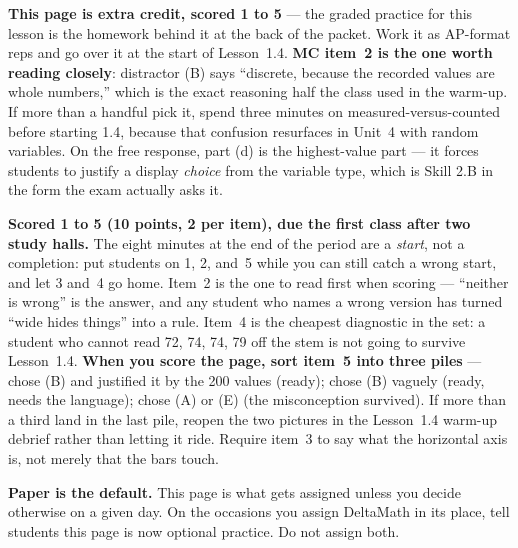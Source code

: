 \documentclass[10pt]{article}
\begin{document}
\begin{teachernote}[AP Practice]
\textbf{This page is extra credit, scored 1 to 5} --- the graded practice for this lesson is the
homework behind it at the back of the packet. Work it as AP-format reps and go over it at the
start of Lesson~1.4. \textbf{MC item~2 is the one worth reading closely}: distractor (B) says
``discrete, because the recorded values are whole numbers,'' which is the exact reasoning half
the class used in the warm-up. If more than a handful pick it, spend three minutes on
measured-versus-counted before starting 1.4, because that confusion resurfaces in Unit~4 with
random variables. On the free response, part (d) is the highest-value part --- it forces students
to justify a display \emph{choice} from the variable type, which is Skill 2.B in the form the
exam actually asks it.
\end{teachernote}

\begin{teachernote}[Homework]
\textbf{Scored 1 to 5 (10 points, 2 per item), due the first class after two study halls.} The eight minutes at the end of the
period are a \emph{start}, not a completion: put students on 1, 2, and~5 while you can still
catch a wrong start, and let 3 and~4 go home. Item~2 is the one to read first when scoring ---
``neither is wrong'' is the answer, and any student who names a wrong version has turned ``wide
hides things'' into a rule. Item~4 is the cheapest diagnostic in the set: a student who cannot
read 72, 74, 74, 79 off the stem is not going to survive Lesson~1.4. \textbf{When you score the
page, sort item~5 into three piles} --- chose (B) and justified it by the 200 values (ready);
chose (B) vaguely (ready, needs the language); chose (A) or (E) (the misconception survived). If
more than a third land in the last pile, reopen the two pictures in the Lesson~1.4 warm-up
debrief rather than letting it ride. Require item~3 to say what the horizontal axis is, not
merely that the bars touch.

\textbf{Paper is the default.} This page is what gets assigned unless you decide otherwise on a
given day. On the occasions you assign DeltaMath in its place, tell students this page is now optional practice. Do not assign both.
\end{teachernote}
\end{document}
